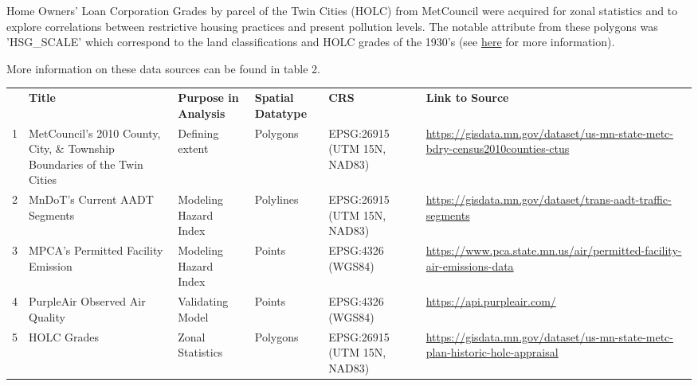 \documentclass[article,12pt]{article}
\numberwithin{equation}{section}
\begin{document}
Home Owners' Loan Corporation Grades by parcel of the Twin Cities (HOLC) from MetCouncil were acquired for zonal statistics and to explore correlations between restrictive housing practices and present pollution levels. The notable attribute from these polygons was 'HSG\_SCALE' which correspond to the land classifications and HOLC grades of the 1930's (see \href{https://ncrc.org/wp-content/uploads/dlm_uploads/2018/02/NCRC-Research-HOLC-10.pdf}{here} for more information).

More information on these data sources can be found in table 2.  
\begin{adjustwidth}{-.88in}{-.88in}
{
	\scriptsize
	\begin{tabular}{|l|p{.23\linewidth}|p{.1\linewidth}|p{.08\linewidth}|p{.1\linewidth}|p{.35\linewidth}|}
	& \textbf{Title}                              & \textbf{Purpose in Analysis} & \textbf{Spatial Datatype} & \textbf{CRS}    & \textbf{Link to Source}    
	\\
	1 & MetCouncil's 2010 County, City, \& Township Boundaries of the Twin Cities \cite{metrocouncil2010}     & Defining extent & Polygons & EPSG:26915 (UTM 15N, NAD83) & \url{https://gisdata.mn.gov/dataset/us-mn-state-metc-bdry-census2010counties-ctus}                                                                 \\
	2 & MnDoT’s Current AADT Segments \cite{mndot_reg}     & Modeling Hazard Index & Polylines & EPSG:26915 (UTM 15N, NAD83) &  \url{https://gisdata.mn.gov/dataset/trans-aadt-traffic-segments}                   \\
	3 & MPCA’s Permitted Facility Emission \cite{mpca_emitter} & Modeling Hazard Index & Points & EPSG:4326 (WGS84) & \url{https://www.pca.state.mn.us/air/permitted-facility-air-emissions-data}        \\
	4 & PurpleAir Observed Air Quality \cite{purpleair}    & Validating Model  & Points & EPSG:4326 (WGS84)     & \url{https://api.purpleair.com/}                                                   \\
	5 & HOLC Grades \cite{HOLC}                       & Zonal Statistics & Polygons & EPSG:26915 (UTM 15N, NAD83)            & \url{https://gisdata.mn.gov/dataset/us-mn-state-metc-plan-historic-holc-appraisal} \\
\end{tabular}
}
\end{adjustwidth}
\end{document}
